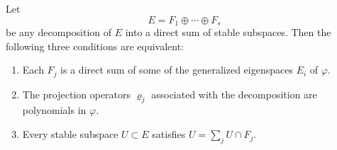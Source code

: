 Let
$$E = F_1 \oplus \cdots \oplus F_s$$
be any decomposition of $E$ into a direct sum of stable subspaces. Then the following three conditions are equivalent:
\begin{enumerate}
  \item[(i)] Each $F_j$ is a direct sum of some of the generalized eigenspaces $E_i$ of $\varphi$.
  \item[(ii)] The projection operators $\varrho_j$ associated with the decomposition are polynomials in $\varphi$.
  \item[(iii)] Every stable subspace $U \subset E$ satisfies $U = \sum_j U \cap F_j$.
\end{enumerate}
